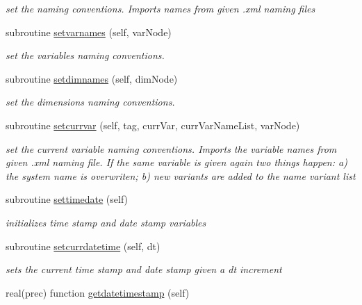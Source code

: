 \begin{DoxyCompactItemize}
\begin{DoxyCompactList}\small\item\em set the naming conventions. Imports names from given .xml naming files \end{DoxyCompactList}\item 
subroutine \mbox{\hyperlink{namespacesimulationglobals__mod_a2c6fa0a9123d06b2110258ea200f4f52}{setvarnames}} (self, var\+Node)
\begin{DoxyCompactList}\small\item\em set the variables naming conventions. \end{DoxyCompactList}\item 
subroutine \mbox{\hyperlink{namespacesimulationglobals__mod_a878fdcfa67037a1bc8411995394c2bef}{setdimnames}} (self, dim\+Node)
\begin{DoxyCompactList}\small\item\em set the dimensions naming conventions. \end{DoxyCompactList}\item 
subroutine \mbox{\hyperlink{namespacesimulationglobals__mod_a4dd64cb7a896b62d90e20a7eab65a6bf}{setcurrvar}} (self, tag, curr\+Var, curr\+Var\+Name\+List, var\+Node)
\begin{DoxyCompactList}\small\item\em set the current variable naming conventions. Imports the variable names from given .xml naming file. If the same variable is given again two things happen\+: a) the system name is overwriten; b) new variants are added to the name variant list \end{DoxyCompactList}\item 
subroutine \mbox{\hyperlink{namespacesimulationglobals__mod_aefda4344f03a705055ad6cb97cb90c65}{settimedate}} (self)
\begin{DoxyCompactList}\small\item\em initializes time stamp and date stamp variables \end{DoxyCompactList}\item 
subroutine \mbox{\hyperlink{namespacesimulationglobals__mod_acbb28eee5547a03dc28c924d8e23ad9a}{setcurrdatetime}} (self, dt)
\begin{DoxyCompactList}\small\item\em sets the current time stamp and date stamp given a dt increment \end{DoxyCompactList}\item 
real(prec) function \mbox{\hyperlink{namespacesimulationglobals__mod_a1fd33b50ae2216b3b7db074da1672398}{getdatetimestamp}} (self)

\end{DoxyCompactItemize}
